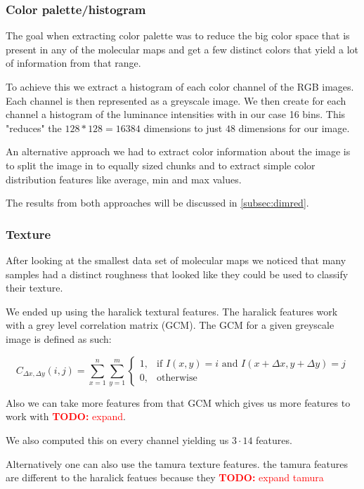 \documentclass[journal]{vgtc}       %
\newcommand{\todo}[1]{\textcolor{red}{\textbf{TODO:} #1}}
\begin{document}
\subsubsection{Color palette/histogram }

The goal when extracting color palette was to reduce the big color space that is present in any of the molecular maps and get a few distinct  colors that yield a lot of information from that range.

To achieve this we extract a histogram of each color channel of the RGB images. Each channel is then represented as a greyscale image. We then create for each channel a histogram of the luminance intensities with in our case 16 bins. This "reduces" the \(128*128 = 16384\) dimensions to just \(48\) dimensions for our image.

An alternative approach we had to extract color information about the image is to split the image in to equally sized chunks and to extract simple color distribution features like average, min and max values.

The results from both approaches will be discussed in \ref{subsec:dimred}.

\subsubsection{Texture}
After looking at the smallest data set of molecular maps we noticed that many samples had a distinct roughness that looked like they could be used to classify their texture.

We ended up using the haralick textural features. The haralick features work with a grey level correlation matrix (GCM). The GCM for a given greyscale image is defined as such:

\[{\displaystyle C_{\Delta x,\Delta y}(i,j)=\sum _{x=1}^{n}\sum _{y=1}^{m}{\begin{cases}1,&{\text{if }}I(x,y)=i{\text{ and }}I(x+\Delta x,y+\Delta y)=j\\0,&{\text{otherwise}}\end{cases}}}\]

Also we can take more features from that GCM which gives us more features to work with \todo{expand}.

We also computed this on every channel yielding us \(3 \cdot 14 \) features.

Alternatively one can also use the tamura texture features. the tamura features are different to the haralick featues because they \todo{expand tamura}
\end{document}
